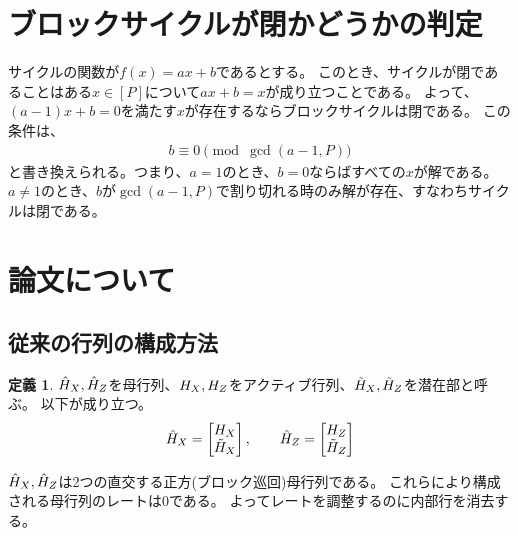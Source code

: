 \documentclass[a4paper,11pt,dvipdfmx]{jsarticle}
\theoremstyle{definition}
\newtheorem{definition}{定義}[section]
\begin{document}
\title{}
\author{}
\date{\today}
\maketitle
\tableofcontents
\clearpage

\section{ブロックサイクルが閉かどうかの判定}\label{ssec:is_cbc}
サイクルの関数が$f(x)=ax+b$であるとする。
このとき、サイクルが閉であることはある$x\in[P]$について$ax+b = x$が成り立つことである。
よって、$(a-1)x+b=0$を満たす$x$が存在するならブロックサイクルは閉である。
この条件は、
\begin{align}
  b \equiv 0 \pmod{\gcd(a-1, P)}\label{eq:cbc}
\end{align}
と書き換えられる。つまり、$a=1$のとき、$b=0$ならばすべての$x$が解である。
$a\neq 1$のとき、$b$が$\gcd(a-1, P)$で割り切れる時のみ解が存在、すなわちサイクルは閉である。

\section{論文\cite{kasai2026breakingorthogonalitybarrierquantum}について}
\subsection{従来の行列の構成方法}
\begin{definition}\label{def:01231}
  $\hat{H}_X,\hat{H}_Z$を母行列、$H_X,H_Z$をアクティブ行列、$\tilde{H}_X,\tilde{H}_Z$を潜在部と呼ぶ。
  以下が成り立つ。
  \begin{align}\label{eq:012313}
  \hat{H}_X = \begin{bmatrix}
  H_X\\
  \tilde{H}_X
  \end{bmatrix},\qquad
  \hat{H}_Z = \begin{bmatrix}
  H_Z\\
  \tilde{H}_Z
  \end{bmatrix}
  \end{align}
\end{definition}
$\hat{H}_X,\hat{H}_Z$は2つの直交する正方(ブロック巡回)母行列である。
これらにより構成される母行列のレートは0である。
よってレートを調整するのに内部行を消去する。
\end{document}
